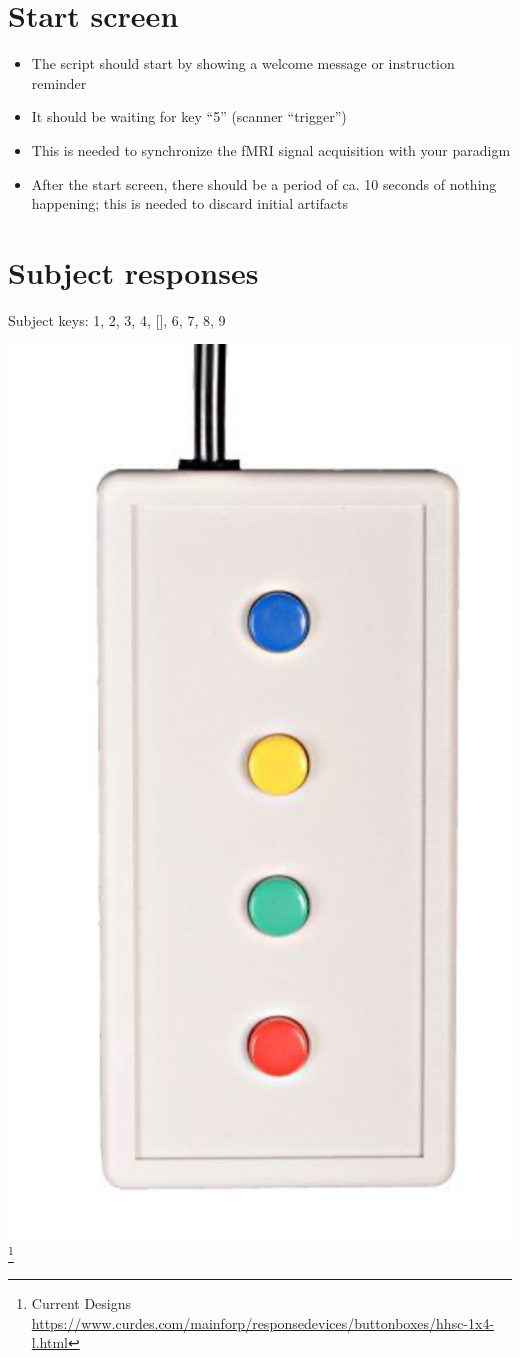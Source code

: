 \documentclass[
  letterpaper,
]{report}
\begin{document}
\section{Start screen}\label{start-screen}

\begin{itemize}
\item
  The script should start by showing a welcome message or instruction
  reminder
\item
  It should be waiting for key ``5'' (scanner ``trigger'')
\item
  This is needed to synchronize the fMRI signal acquisition with your
  paradigm
\item
  After the start screen, there should be a period of ca. 10 seconds of
  nothing happening; this is needed to discard initial artifacts
\end{itemize}

\section{Subject responses}\label{subject-responses}

Subject keys: 1, 2, 3, 4, {[}{]}, 6, 7, 8, 9

\includegraphics[width=0.5\linewidth,height=\textheight,keepaspectratio]{images/clipboard-4146499127.png}\footnote{Current
  Designs
  \url{https://www.curdes.com/mainforp/responsedevices/buttonboxes/hhsc-1x4-l.html}}
\end{document}
